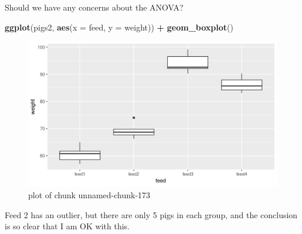 \documentclass[ignorenonframetext,]{beamer}
\newenvironment{Shaded}{\begin{snugshade}}{\end{snugshade}}
\newcommand{\DataTypeTok}[1]{\textcolor[rgb]{0.13,0.29,0.53}{#1}}
\newcommand{\KeywordTok}[1]{\textcolor[rgb]{0.13,0.29,0.53}{\textbf{#1}}}
\newcommand{\NormalTok}[1]{#1}
\newcommand{\OperatorTok}[1]{\textcolor[rgb]{0.81,0.36,0.00}{\textbf{#1}}}
\newcommand{\StringTok}[1]{\textcolor[rgb]{0.31,0.60,0.02}{#1}}
\begin{document}
\begin{frame}[fragile]{Should we have any concerns about the ANOVA?}
\protect\hypertarget{should-we-have-any-concerns-about-the-anova}{}

\begin{Shaded}
\begin{Highlighting}[]
\KeywordTok{ggplot}\NormalTok{(pigs2, }\KeywordTok{aes}\NormalTok{(}\DataTypeTok{x =}\NormalTok{ feed, }\DataTypeTok{y =}\NormalTok{ weight)) }\OperatorTok{+}\StringTok{ }\KeywordTok{geom_boxplot}\NormalTok{()}
\end{Highlighting}
\end{Shaded}

\begin{figure}
\centering
\includegraphics{figure/unnamed-chunk-173-1.png}
\caption{plot of chunk unnamed-chunk-173}
\end{figure}

Feed 2 has an outlier, but there are only 5 pigs in each group, and the
conclusion is so clear that I am OK with this.

\end{frame}
\end{document}
